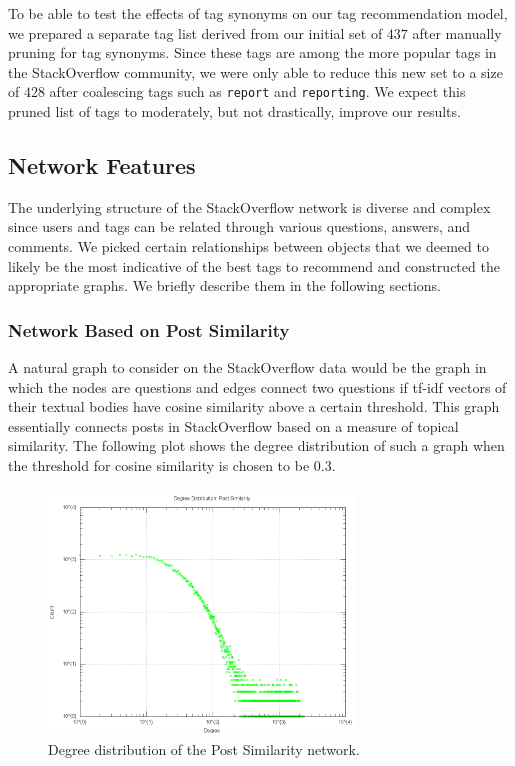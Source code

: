 \documentclass[11pt]{IEEEtran}
\begin{document}
To be able to test the effects of tag synonyms on our tag recommendation model, we prepared a separate tag list derived from our initial set of $437$ after manually pruning for tag synonyms. Since these tags are among the more popular tags in the StackOverflow community, we were only able to reduce this new set to a size of $428$ after coalescing tags such as \texttt{report} and \texttt{reporting}. We expect this pruned list of tags to moderately, but not drastically, improve our results.

\subsection{Network Features}

The underlying structure of the StackOverflow network is diverse and complex since users and tags can be related through various questions, answers, and comments. We picked certain relationships between objects that we deemed to likely be the most indicative of the best tags to recommend and constructed the appropriate graphs. We briefly describe them in the following sections.

\subsubsection{Network Based on Post Similarity}

A natural graph to consider on the StackOverflow data would be the graph in which the nodes are questions and edges connect two questions if tf-idf vectors of their textual bodies have cosine similarity above a certain threshold. This graph essentially connects posts in StackOverflow based on a measure of topical similarity. The following plot shows the degree distribution of such a graph when the threshold for cosine similarity is chosen to be $0.3$.

\begin{figure}[h]
  \centering
    \includegraphics[width=3.2in]{similarity_degdistr.png}
  \caption{Degree distribution of the Post Similarity network.}
  \label{fig:post_dd}
\end{figure}
\end{document}
